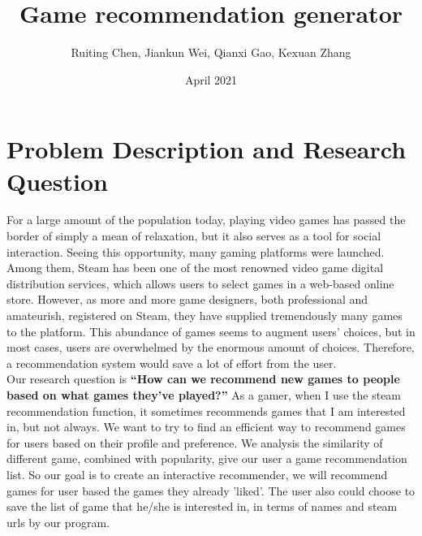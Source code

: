 \documentclass{article}
\title{Game recommendation generator}
\author{Ruiting Chen, Jiankun Wei, Qianxi Gao, Kexuan Zhang }
\date{April 2021}
\begin{document}
\maketitle

\section{Problem Description and Research Question}  
For a large amount of the population today, playing video games has passed the border of simply a mean of relaxation, but it also serves as a tool for social interaction. Seeing this opportunity, many gaming platforms were launched. Among them, Steam has been one of the most renowned video game digital distribution services, which allows users to select games in a web-based online store. However,  as more and more game designers, both professional and amateurish, registered on Steam, they have supplied tremendously many games to the platform. This abundance of games seems to augment users' choices, but in most cases, users are overwhelmed by the enormous amount of choices. Therefore, a recommendation system would save a lot of effort from the user.\\  
Our research question is \textbf{“How can we recommend new games to people based on what games they’ve played?”} As a gamer, when I use the steam recommendation function, it sometimes recommends games that I am interested in, but not always. We want to try to find an efficient way to recommend games for users based on their profile and preference. We analysis the similarity of different game, combined with popularity, give our user a game recommendation list. So our goal is to create an interactive recommender, we will recommend games for user based the games they already 'liked'. The user also could choose to save the list of game that he/she is interested in, in terms of names and steam urls by our program.
\end{document}
